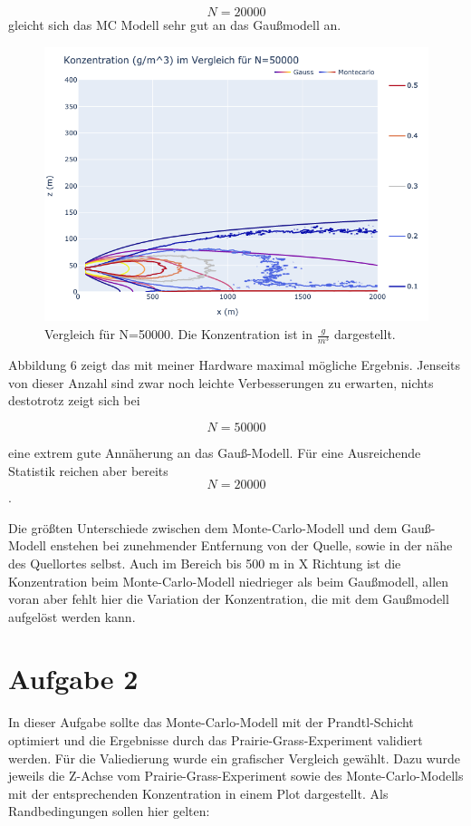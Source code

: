 \documentclass[ngerman]{scrartcl}
\begin{document}
\begin{equation}
	N=20000
\end{equation}
gleicht sich das MC Modell sehr gut an das Gaußmodell an.
\begin{figure}[H]
	\centering
	\includegraphics[scale=0.5]{Bilder/1b50k.png}
	\caption{Vergleich für N=50000.  Die Konzentration ist in $\frac{\si{g}}{\si{m^3}}$ dargestellt.}
	\label{fig:my_label}
\end{figure}
Abbildung 6  zeigt das mit meiner Hardware maximal mögliche Ergebnis. Jenseits von dieser Anzahl sind zwar noch leichte Verbesserungen zu erwarten, nichts destotrotz zeigt sich bei 

\begin{equation}
	N=50000
\end{equation}

eine extrem gute Annäherung an das Gauß-Modell. Für eine Ausreichende Statistik reichen aber bereits 
\begin{equation}
	N=20000
\end{equation}.

Die größten Unterschiede zwischen dem Monte-Carlo-Modell und dem Gauß-Modell enstehen bei zunehmender Entfernung von der Quelle, sowie in der nähe des Quellortes selbst. Auch im Bereich bis 500 m  in X Richtung ist die Konzentration beim Monte-Carlo-Modell niedrieger als beim Gaußmodell, allen voran aber fehlt hier die Variation der Konzentration, die mit dem Gaußmodell aufgelöst werden kann. 
\section{Aufgabe 2}
In dieser Aufgabe sollte das Monte-Carlo-Modell mit der Prandtl-Schicht optimiert und die Ergebnisse durch das Prairie-Grass-Experiment validiert werden. Für die Valiedierung wurde ein grafischer Vergleich gewählt. Dazu wurde jeweils die Z-Achse vom Prairie-Grass-Experiment sowie des Monte-Carlo-Modells mit der entsprechenden Konzentration in einem Plot dargestellt. Als Randbedingungen sollen hier gelten:
\end{document}
